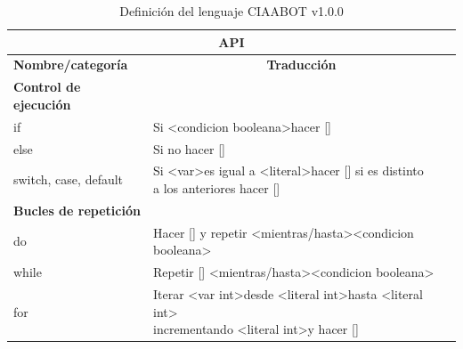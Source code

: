 \begin{longtable}[c]{ll}
\caption{Definición del lenguaje CIAABOT v1.0.0}
\label{tab:definicion-lenguaje}\\
\hline
\multicolumn{2}{c}{\textbf{API}}                                                                                                                                                                                                    \\ \hline
\endhead
%
\multicolumn{1}{l}{\textbf{Nombre/categoría}} & \multicolumn{1}{c}{\textbf{Traducción}}                                                                                                                                             \\ \hline
\textbf{Control de ejecución}                 &                                                                                                                                                                                     \\ \hline
if                                            & Si \textless condicion booleana\textgreater hacer {[}{]}                                                                                                                            \\
else                                          & Si no hacer {[}{]}                                                                                                                                                                  \\
switch, case, default                         & \makecell[ll]{Si \textless var\textgreater es igual a \textless literal\textgreater hacer {[}{]} si es distinto \\ a los anteriores hacer {[}{]}}                                                     \\ \hline
\textbf{Bucles de repetición}                 &                                                                                                                                                                                     \\ \hline
do                                            & Hacer {[}{]} y repetir \textless mientras/hasta\textgreater \textless condicion booleana\textgreater                                                                                \\
while                                         & Repetir {[}{]} \textless mientras/hasta\textgreater \textless condicion booleana\textgreater                                                                                        \\
for                                           & \makecell[ll]{Iterar \textless var int\textgreater desde \textless literal int\textgreater hasta \textless literal int\textgreater \\ incrementando \textless literal int\textgreater y hacer {[}{]} }\\


\end{longtable}
